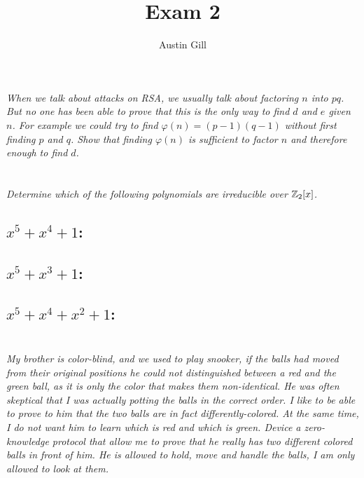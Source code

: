 \documentclass[12pt]{article}
\title{Exam 2}
\author{Austin Gill}
\begin{document}
\maketitle

\section{} \textit{When we talk about attacks on RSA, we usually talk about factoring $n$ into $pq$. But no one has been able to prove that this is the only way to find $d$ and $e$ given $n$. For example we could try to find $\varphi(n) = (p-1)(q-1)$ without first finding $p$ and $q$. Show that finding $\varphi(n)$ is sufficient to factor $n$ and therefore enough to find $d$.}

\section{} \textit{Determine which of the following polynomials are irreducible over $\mathbb{Z}_2 [x]$.}

    \subsection{$x^5 + x^4 + 1$:}

    \subsection{$x^5 + x^3 + 1$:}

    \subsection{$x^5 + x^4 + x^2 + 1$:}

\section{} \textit{My brother is color-blind, and we used to play snooker, if the balls had moved from their original positions he could not distinguished between a red and the green ball, as it is only the color that makes them non-identical. He was often skeptical that I was actually potting the balls in the correct order. I like to be able to prove to him that the two balls are in fact differently-colored. At the same time, I do not want him to learn which is red and which is green. Device a zero-knowledge protocol that allow me to prove that he really has two different colored balls in front of him. He is allowed to hold, move and handle the balls, I am only allowed to look at them. }
\end{document}
